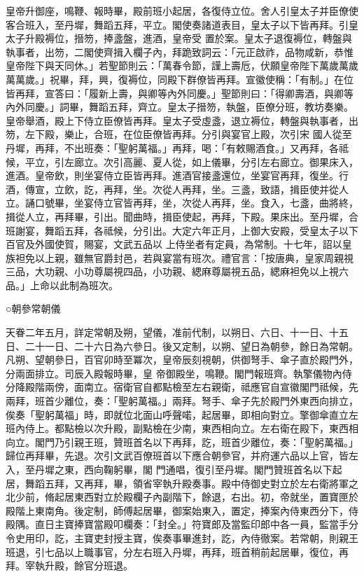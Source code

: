 \begin{pinyinscope}
 皇帝升御座，鳴鞭、報時畢，殿前班小起居，各復侍立位。舍人引皇太子并臣僚使客合班入，至丹墀，舞蹈五拜，平立。閣使奏諸道表目，皇太子以下皆再拜。引皇太子升殿褥位，搢笏，捧盞盤，進酒，皇帝受
 置於案。皇太子退復褥位，轉盤與執事者，出笏，二閣使齊揖入欄子內，拜跪致詞云：「元正啟祚，品物咸新，恭惟皇帝陛下與天同休。」若聖節則云：「萬春令節，謹上壽卮，伏願皇帝陛下萬歲萬歲萬萬歲。」祝畢，拜，興，復褥位，同殿下群僚皆再拜。宣徽使稱：「有制。」在位皆再拜，宣答曰：「履新上壽，與卿等內外同慶。」聖節則曰：「得卿壽酒，與卿等內外同慶。」詞畢，舞蹈五拜，齊立。皇太子搢笏，執盤，臣僚分班，教坊奏樂。皇帝舉酒，殿上下侍立臣僚皆再拜。皇太子受虛盞，退立褥位，轉盤與執事者，出笏，左下殿，樂止，合班，在位臣僚皆再拜。分引與宴官上殿，次引宋
 國人從至丹墀，再拜，不出班奏：「聖躬萬福。」再拜，喝：「有敕賜酒食。」又再拜，各祗候，平立，引左廊立。次引高麗、夏人從，如上儀畢，分引左右廊立。御果床入，進酒。皇帝飲，則坐宴侍立臣皆再拜。進酒官接盞還位，坐宴官再拜，復坐。行酒，傳宣，立飲，訖，再拜，坐。次從人再拜，坐。三盞，致語，揖臣使并從人立。誦口號畢，坐宴侍立官皆再拜，坐，次從人再拜，坐。食入，七盞，曲將終，揖從人立，再拜畢，引出。聞曲時，揖臣使起，再拜，下殿。果床出。至丹墀，合班謝宴，舞蹈五拜，各祗候，分引出。大定六年正月，上御大安殿，受皇太子以下百官及外國使賀，賜宴，文武五品以
 上侍坐者有定員，為常制。十七年，詔以皇族袒免以上親，雖無官爵封邑，若與宴當有班次。禮官言：「按唐典，皇家周親視三品，大功親、小功尊屬視四品，小功親、緦麻尊屬視五品，緦麻袒免以上視六品。」上命以此制為班次。



 ○朝參常朝儀



 天眷二年五月，詳定常朝及朔，望儀，准前代制，以朔日、六日、十一日、十五日、二十一日、二十六日為六參日。後又定制，以朔、望日為朝參，餘日為常朝。凡朔、望朝參日，百官卯時至冪次，皇帝辰刻視朝，供御弩手、傘子直於殿門外，分兩面排立。司辰入殿報時畢，皇
 帝御殿坐，鳴鞭。閣門報班齊。執擎儀物內侍分降殿階兩傍，面南立。宿衛官自都點檢至左右親衛，祗應官自宣徽閣門祗候，先兩拜，班首少離位，奏：「聖躬萬福。」兩拜。弩手、傘子先於殿門外東西向排立，俟奏「聖躬萬福」時，即就位北面山呼聲喏，起居畢，即相向對立。擎御傘直立左班內侍上。都點檢以次升殿，副點檢在少南，東西相向立。左右衛在殿下，東西相向立。閣門乃引親王班，贊班首名以下再拜，訖，班首少離位，奏：「聖躬萬福。」歸位再拜畢，先退。次引文武百僚班首以下應合朝參官，并府運六品以上官，皆左入，至丹墀之東，西向鞠躬畢，閣
 門通唱，復引至丹墀。閣門贊班首名以下起居，舞蹈五拜，又再拜，畢，領省宰執升殿奏事。殿中侍御史對立於左右衛將軍之北少前，脩起居東西對立於殿欄子內副階下，餘退，右出。初，帝就坐，置寶匣於殿階上東南角。後定制，師傅起居畢，御案始東入，置定，捧案內侍東西分下，侍殿隅。直日主寶捧寶當殿叩欄奏：「封全。」符寶郎及當監印郎中各一員，監當手分令史用印，訖，主寶吏封授主寶，俟奏事畢進封，訖，內侍徹案。若常朝，則親王班退，引七品以上職事官，分左右班入丹墀，再拜，班首稍前起居畢，復位，再拜。宰執升殿，餘官分班退。




\end{pinyinscope}
